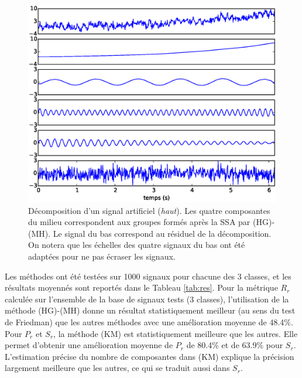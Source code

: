 \documentclass{gretsi}
\begin{document}
    \begin{figure}[tp]
        \centering
        \includegraphics[width=.5\textwidth]{img/artsig3.eps}
        \caption{Décomposition d'un signal artificiel (\emph{haut}). Les quatre composantes du milieu correspondent aux groupes formés après la SSA par (HG)-(MH). Le signal du bas correspond au résiduel de la décomposition. On notera que les échelles des quatre signaux du bas ont été adaptées pour ne pas écraser les signaux.} %
        \label{fig:dec}
    \end{figure}

Les méthodes ont été testées sur 1000 signaux pour chacune des 3 classes, et les résultats moyennés sont reportés dans le Tableau \ref{tab:res}.
Pour la métrique $R_r$ calculée sur l'ensemble de la base de signaux tests (3 classes), l'utilisation de la méthode (HG)-(MH) donne un résultat statistiquement meilleur (au sens du test de Friedman) que les autres méthodes avec une amélioration moyenne de 48.4\%.
Pour $P_r$ et $S_r$, la méthode (KM) est statistiquement meilleure que les autres.
Elle permet d'obtenir une amélioration moyenne de $P_r$ de 80.4\% et de 63.9\% pour $S_r$.
L'estimation précise du nombre de composantes dans (KM) explique la précision largement meilleure que les autres, ce qui se traduit aussi dans $S_r$.

\end{document}
